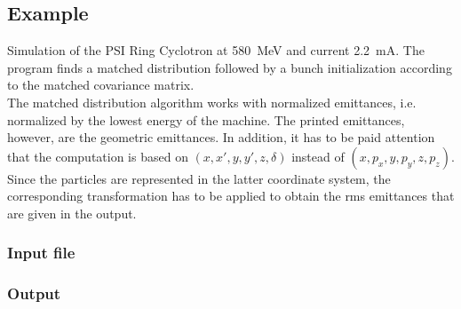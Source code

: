 \subsection{Example}
Simulation of the PSI Ring Cyclotron at \SI{580}{\mega\electronvolt} and current \SI{2.2}{\milli\ampere}. The program finds a matched
distribution followed by a bunch initialization according to the matched covariance matrix.\\
The matched distribution algorithm works with normalized emittances, i.e. normalized by the lowest energy of the
machine. The printed emittances, however, are the geometric emittances. In addition, it has to
be paid attention that the computation is based on $(x,x',y,y',z,\delta)$ instead of $(x,p_{x},y,p_{y},z,p_{z})$. Since
the particles are represented in the latter coordinate system, the corresponding transformation has to be applied to
obtain the rms emittances that are given in the output.
\subsubsection{Input file}
\subsubsection{Output}

